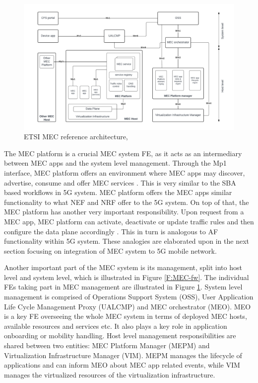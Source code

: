\documentclass[12pt,a4paper,twoside]{report}
\begin{document}
\begin{figure}[ht]
	\centering
	\includegraphics[width=\textwidth]{./images/MEC-ref-arch.pdf}
	\caption{ETSI MEC reference architecture, \cite{ETSI:GS:MEC003}}
	\label{F:MEC-ref-arch}
\end{figure}

The MEC platform is a crucial MEC system FE, as it acts as an intermediary between MEC apps and the system level management. Through the Mp1 interface, MEC platform offers an environment where MEC apps may discover, advertise, consume and offer MEC services \cite{ETSI:GS:app-ena}. This is very similar to the SBA based workflows in 5G system. MEC platform offers the MEC apps similar functionality to what NEF and NRF offer to the 5G system. On top of that, the MEC platform has another very important responsibility. Upon request from a MEC app, MEC platform can activate, deactivate or update traffic rules and then configure the data plane accordingly \cite{ETSI:GS:MEC003}. This in turn is analogous to AF functionality within 5G system. These analogies are elaborated upon in the next section focusing on integration of MEC system to 5G mobile network.

Another important part of the MEC system is its management, split into host level and system level, which is illustrated in Figure \ref{F:MEC-fw}. The individual FEs taking part in MEC management are illustrated in Figure \ref{F:MEC-ref-arch}. System level management is comprised of Operations Support System (OSS), User Application Life Cycle Management Proxy (UALCMP) and MEC orchestrator (MEO). MEO is a key FE overseeing the whole MEC system in terms of deployed MEC hosts, available resources and services etc. It also plays a key role in application onboarding or mobility handling. Host level management responsibilities are shared between two entities: MEC Platform Manager (MEPM) and Virtualization Infrastructure Manager (VIM). MEPM manages the lifecycle of applications and can inform MEO about MEC app related events, while VIM manages the virtualized resources of the virtualization infrastructure. \cite{ETSI:GS:MEC003}
\end{document}
